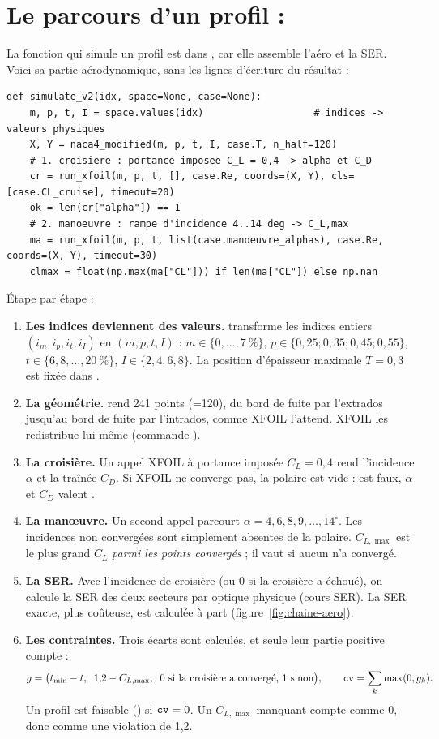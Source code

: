 \section{Le parcours d'un profil : }
La fonction qui simule un profil est dans , car elle assemble l'aéro et la SER. Voici sa partie aérodynamique, sans les lignes d'écriture du résultat :
\begin{lstlisting}
def simulate_v2(idx, space=None, case=None):
    m, p, t, I = space.values(idx)                   # indices -> valeurs physiques
    X, Y = naca4_modified(m, p, t, I, case.T, n_half=120)
    # 1. croisiere : portance imposee C_L = 0,4 -> alpha et C_D
    cr = run_xfoil(m, p, t, [], case.Re, coords=(X, Y), cls=[case.CL_cruise], timeout=20)
    ok = len(cr["alpha"]) == 1
    # 2. manoeuvre : rampe d'incidence 4..14 deg -> C_L,max
    ma = run_xfoil(m, p, t, list(case.manoeuvre_alphas), case.Re, coords=(X, Y), timeout=30)
    clmax = float(np.max(ma["CL"])) if len(ma["CL"]) else np.nan
\end{lstlisting}
Étape par étape :
\begin{enumerate}
\item \textbf{Les indices deviennent des valeurs.}  transforme les indices entiers $(i_m,i_p,i_t,i_I)$ en $(m,p,t,I)$ : $m\in\{0,\dots,7~\%\}$, $p\in\{0{,}25;0{,}35;0{,}45;0{,}55\}$, $t\in\{6,8,\dots,20~\%\}$, $I\in\{2,4,6,8\}$. La position d'épaisseur maximale $T=0{,}3$ est fixée dans .
\item \textbf{La géométrie.}  rend 241 points (=120), du bord de fuite par l'extrados jusqu'au bord de fuite par l'intrados, comme XFOIL l'attend. XFOIL les redistribue lui-même (commande ).
\item \textbf{La croisière.} Un appel XFOIL à portance imposée $C_L=0{,}4$ rend l'incidence $\alpha$ et la traînée $C_D$. Si XFOIL ne converge pas, la polaire est vide :  est faux, $\alpha$ et $C_D$ valent .
\item \textbf{La manœuvre.} Un second appel parcourt $\alpha=4,6,8,9,\dots,14^\circ$. Les incidences non convergées sont simplement absentes de la polaire. $C_{L,\max}$ est le plus grand $C_L$ \emph{parmi les points convergés} ; il vaut  si aucun n'a convergé.
\item \textbf{La SER.} Avec l'incidence de croisière (ou 0 si la croisière a échoué), on calcule la SER des deux secteurs par optique physique (cours SER). La SER exacte, plus coûteuse, est calculée à part (figure~\ref{fig:chaine-aero}).
\item \textbf{Les contraintes.} Trois écarts sont calculés, et seule leur partie positive compte :
\[
g=\big(t_{\min}-t,\;\; 1{,}2-C_{L,\max},\;\; \text{0 si la croisière a convergé, 1 sinon}\big),\qquad
\texttt{cv}=\sum_k\max(0,g_k).
\]
Un profil est faisable () si $\texttt{cv}=0$. Un $C_{L,\max}$ manquant compte comme 0, donc comme une violation de 1,2.
\end{enumerate}


